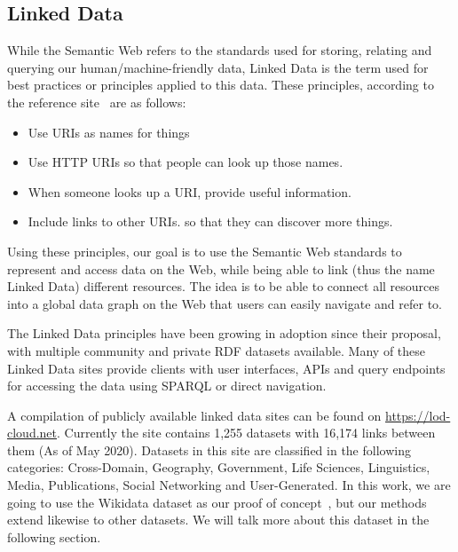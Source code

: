 
\subsection{Linked Data}

While the Semantic Web refers to the standards used for storing, relating and querying our human/machine-friendly data, Linked Data is the term used for best practices or principles applied to this data. These principles, according to the reference site~\cite{LinkedData} are as follows:

\begin{itemize}
    \item Use URIs as names for things
    \item Use HTTP URIs so that people can look up those names.
    \item When someone looks up a URI, provide useful information.
    \item Include links to other URIs. so that they can discover more things.
\end{itemize}

Using these principles, our goal is to use the Semantic Web standards to represent and access data on the Web, while being able to link (thus the name Linked Data) different resources. The idea is to be able to connect all resources into a global data graph on the Web that users can easily navigate and refer to.

The Linked Data principles have been growing in adoption since their proposal, with multiple community and private RDF datasets available. Many of these Linked Data sites provide clients with user interfaces, APIs and query endpoints for accessing the data using SPARQL or direct navigation. 

A compilation of publicly available linked data sites can be found on \url{https://lod-cloud.net}. Currently the site contains 1,255 datasets with 16,174 links between them (As of May 2020). Datasets in this site are classified in the following categories: Cross-Domain, Geography, Government, Life Sciences, Linguistics, Media, Publications, Social Networking and User-Generated. In this work, we are going to use the Wikidata dataset as our proof of concept~\cite{wikidataQueryService}, but our methods extend likewise to other datasets. We will talk more about this dataset in the following section.


